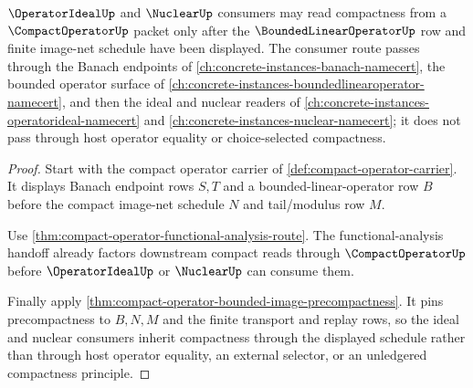 \begin{theorem}
\label{thm:compact-operator-ideal-consumer-boundary}
$\OperatorIdealUp$ and $\NuclearUp$ consumers may read compactness from a $\CompactOperatorUp$ packet only after the $\BoundedLinearOperatorUp$ row and finite image-net schedule have been displayed. The consumer route passes through the Banach endpoints of \autoref{ch:concrete-instances-banach-namecert}, the bounded operator surface of \autoref{ch:concrete-instances-boundedlinearoperator-namecert}, and then the ideal and nuclear readers of \autoref{ch:concrete-instances-operatorideal-namecert} and \autoref{ch:concrete-instances-nuclear-namecert}; it does not pass through host operator equality or choice-selected compactness.
\end{theorem}
\begin{proof}
Start with the compact operator carrier of \autoref{def:compact-operator-carrier}. It displays Banach endpoint rows $S,T$ and a bounded-linear-operator row $B$ before the compact image-net schedule $N$ and tail/modulus row $M$.

Use \autoref{thm:compact-operator-functional-analysis-route}. The functional-analysis handoff already factors downstream compact reads through $\CompactOperatorUp$ before $\OperatorIdealUp$ or $\NuclearUp$ can consume them.

Finally apply \autoref{thm:compact-operator-bounded-image-precompactness}. It pins precompactness to $B,N,M$ and the finite transport and replay rows, so the ideal and nuclear consumers inherit compactness through the displayed schedule rather than through host operator equality, an external selector, or an unledgered compactness principle.
\end{proof}

